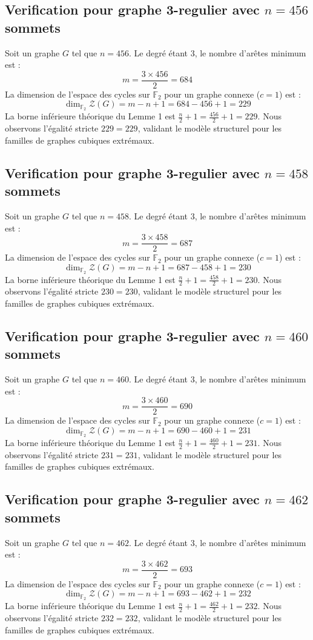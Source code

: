 \documentclass[11pt,a4paper]{article}
\begin{document}
\subsection{Verification pour graphe 3-regulier avec $n=456$ sommets}
Soit un graphe $G$ tel que $n = 456$. Le degré étant 3, le nombre d'arêtes minimum est :
$$ m = \frac{3 \times 456}{2} = 684 $$
La dimension de l'espace des cycles sur $\mathbb{F}_2$ pour un graphe connexe ($c=1$) est :
$$ \dim_{\mathbb{F}_2} \mathcal{Z}(G) = m - n + 1 = 684 - 456 + 1 = 229 $$
La borne inférieure théorique du Lemme 1 est $\frac{n}{2} + 1 = \frac{456}{2} + 1 = 229$.
Nous observons l'égalité stricte $229 = 229$, validant le modèle structurel pour les familles de graphes cubiques extrémaux.

\subsection{Verification pour graphe 3-regulier avec $n=458$ sommets}
Soit un graphe $G$ tel que $n = 458$. Le degré étant 3, le nombre d'arêtes minimum est :
$$ m = \frac{3 \times 458}{2} = 687 $$
La dimension de l'espace des cycles sur $\mathbb{F}_2$ pour un graphe connexe ($c=1$) est :
$$ \dim_{\mathbb{F}_2} \mathcal{Z}(G) = m - n + 1 = 687 - 458 + 1 = 230 $$
La borne inférieure théorique du Lemme 1 est $\frac{n}{2} + 1 = \frac{458}{2} + 1 = 230$.
Nous observons l'égalité stricte $230 = 230$, validant le modèle structurel pour les familles de graphes cubiques extrémaux.

\subsection{Verification pour graphe 3-regulier avec $n=460$ sommets}
Soit un graphe $G$ tel que $n = 460$. Le degré étant 3, le nombre d'arêtes minimum est :
$$ m = \frac{3 \times 460}{2} = 690 $$
La dimension de l'espace des cycles sur $\mathbb{F}_2$ pour un graphe connexe ($c=1$) est :
$$ \dim_{\mathbb{F}_2} \mathcal{Z}(G) = m - n + 1 = 690 - 460 + 1 = 231 $$
La borne inférieure théorique du Lemme 1 est $\frac{n}{2} + 1 = \frac{460}{2} + 1 = 231$.
Nous observons l'égalité stricte $231 = 231$, validant le modèle structurel pour les familles de graphes cubiques extrémaux.

\subsection{Verification pour graphe 3-regulier avec $n=462$ sommets}
Soit un graphe $G$ tel que $n = 462$. Le degré étant 3, le nombre d'arêtes minimum est :
$$ m = \frac{3 \times 462}{2} = 693 $$
La dimension de l'espace des cycles sur $\mathbb{F}_2$ pour un graphe connexe ($c=1$) est :
$$ \dim_{\mathbb{F}_2} \mathcal{Z}(G) = m - n + 1 = 693 - 462 + 1 = 232 $$
La borne inférieure théorique du Lemme 1 est $\frac{n}{2} + 1 = \frac{462}{2} + 1 = 232$.
Nous observons l'égalité stricte $232 = 232$, validant le modèle structurel pour les familles de graphes cubiques extrémaux.
\end{document}
